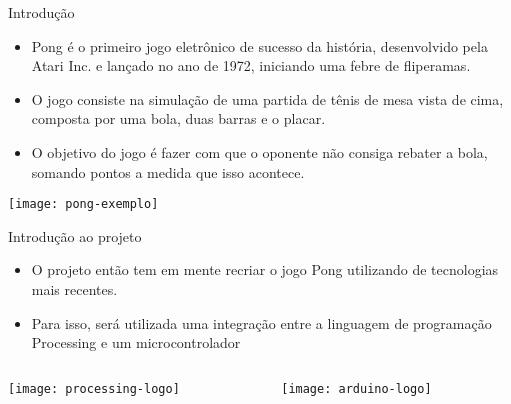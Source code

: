 
\begin{frame}[t]{Introdução} 

  	\begin{itemize}
        \item  Pong é o primeiro jogo eletrônico de sucesso da história, desenvolvido pela Atari Inc. e lançado no ano de 1972, iniciando uma febre de fliperamas.
        \item O jogo consiste na simulação de uma partida de tênis de mesa vista de cima, composta por uma bola, duas barras e o placar.
        \item O objetivo do jogo é fazer com que o oponente não consiga rebater a bola, somando pontos a medida que isso acontece.
    \end{itemize}
\vspace{0.3cm}
	\centering
	\texttt{[image: pong-exemplo]}    
          
\end{frame}
\begin{frame}[c]{Introdução ao projeto}
 
\begin{itemize}
        \item  O projeto então tem em mente recriar o jogo Pong utilizando de tecnologias mais recentes.
        \item Para isso, será utilizada uma integração entre a linguagem de programação Processing e um microcontrolador
    \end{itemize}
\vspace{1cm}

\begin{columns}
	\begin{column}{0.2\textwidth}
        	\texttt{[image: processing-logo]} 
	\end{column}
		\begin{column}{0.2\textwidth}
		\centering
       	\texttt{[image: arduino-logo]} 
	\end{column}
\end{columns}

\end{frame}
